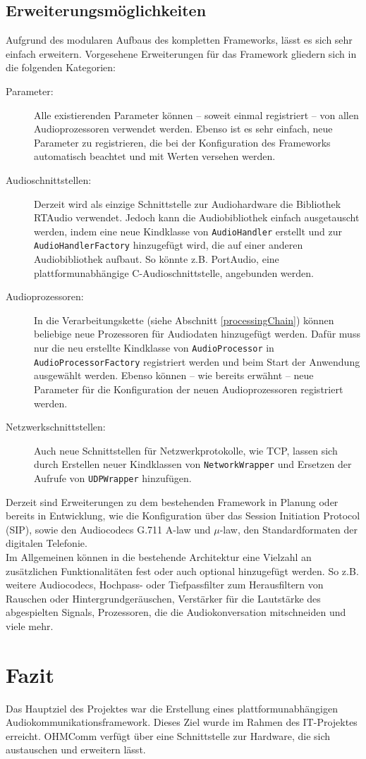 \subsection{Erweiterungsmöglichkeiten}
Aufgrund des modularen Aufbaus des kompletten Frameworks, lässt es sich sehr einfach erweitern. Vorgesehene Erweiterungen für das Framework gliedern sich in die folgenden Kategorien:
\begin{description}
\item[Parameter:] Alle existierenden Parameter können -- soweit einmal registriert -- von allen Audioprozessoren verwendet werden. Ebenso ist es sehr einfach, neue Parameter zu registrieren, die bei der Konfiguration des Frameworks automatisch beachtet und mit Werten versehen werden.
\item[Audioschnittstellen:] Derzeit wird als einzige Schnittstelle zur Audiohardware die Bibliothek RTAudio verwendet. Jedoch kann die Audiobibliothek einfach ausgetauscht werden, indem eine neue Kindklasse von \texttt{AudioHandler} erstellt und zur \texttt{AudioHandlerFactory} hinzugefügt wird, die auf einer anderen Audiobibliothek aufbaut. So könnte z.B. PortAudio, eine plattformunabhängige C-Audioschnittstelle, angebunden werden.
\item[Audioprozessoren:] In die Verarbeitungskette (siehe Abschnitt \ref{processingChain}) können beliebige neue Prozessoren für Audiodaten hinzugefügt werden. Dafür muss nur die neu erstellte Kindklasse von \texttt{AudioProcessor} in \texttt{AudioProcessorFactory} registriert werden und beim Start der Anwendung ausgewählt werden. Ebenso können -- wie bereits erwähnt -- neue Parameter für die Konfiguration der neuen Audioprozessoren registriert werden.
\item[Netzwerkschnittstellen:] Auch neue Schnittstellen für Netzwerkprotokolle, wie TCP, lassen sich durch Erstellen neuer Kindklassen von \texttt{NetworkWrapper} und Ersetzen der Aufrufe von \texttt{UDPWrapper} hinzufügen.
\end{description}
Derzeit sind Erweiterungen zu dem bestehenden Framework in Planung oder bereits in Entwicklung, wie die Konfiguration über das Session Initiation Protocol (SIP), sowie den Audiocodecs G.711 A-law und $\mu$-law, den Standardformaten der digitalen Telefonie.
\\
Im Allgemeinen können in die bestehende Architektur eine Vielzahl an zusätzlichen Funktionalitäten fest oder auch optional hinzugefügt werden. So z.B. weitere Audiocodecs, Hochpass- oder Tiefpassfilter zum Herausfiltern von Rauschen oder Hintergrundgeräuschen, Verstärker für die Lautstärke des abgespielten Signals, Prozessoren, die die Audiokonversation mitschneiden und viele mehr.

\section{Fazit}
Das Hauptziel des Projektes war die Erstellung eines plattformunabhängigen Audiokommunikationsframework. Dieses Ziel wurde im Rahmen des IT-Projektes erreicht. OHMComm verfügt über eine Schnittstelle zur Hardware, die sich austauschen und erweitern lässt.
